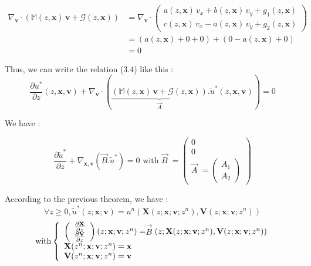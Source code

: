 \documentclass[10pt]{article}
\newcommand{\D}{{\partial}}
\begin{document}
\begin{align*}
\nabla_{\mathbf{v}} \cdot \left(\mathbb{M}(z,\mathbf{x})\,\mathbf{v}+\mathcal{G}(z,\mathbf{x})\right)
&= \nabla_{\mathbf{v}} \cdot \left(\begin{array}{c}
a(z,\mathbf{x})\,v_x+b(z,\mathbf{x})\,v_y+g_1(z,\mathbf{x}) \\ c(z,\mathbf{x})\,v_x-a(z,\mathbf{x})\,v_y+g_2(z,\mathbf{x})
\end{array}\right) \\
&= (a(z,\mathbf{x}) + 0 + 0) + (0 - a(z,\mathbf{x}) + 0) \\
&= 0
\end{align*}

Thus, we can write the relation (3.4) like this : \\

$$
\frac{\D u^*}{\D z}(z,\mathbf{x},\mathbf{v}) + \nabla_{\mathbf{v}}\cdot\left(\underbrace{\left(\mathbb{M}(z,\mathbf{x})\,\mathbf{v}+\mathcal{G}(z,\mathbf{x})\right)}_{\stackrel{\rightarrow}{A}}.\tilde{u}^*(z,\mathbf{x},\mathbf{v})\right) = 0
$$

We have :

$$\frac{\D \tilde{u}^*}{\D z} + \nabla_{\mathbf{x,v}}\left(\stackrel{\rightarrow}{B}.\tilde{u}^*\right) = 0 \mbox{ with } \stackrel{\rightarrow}{B}\; = \left(\begin{array}{c}
0 \\ 0 \\ \stackrel{\rightarrow}{A}\; = \left(\begin{array}{c}
A_1 \\ A_2
\end{array}\right)
\end{array}\right)$$

According to the previous theorem, we have :
$$
\forall z\geqslant 0, \tilde{u}^*(z;\mathbf{x;v}) = u^n\left(\mathbf{X}(z;\mathbf{x;v};z^n),\mathbf{V}(z;\mathbf{x;v};z^n)\right)
$$
$$
\mbox{ with} \\
\left\lbrace\begin{array}{l}
\left(\begin{array}{c}
\frac{\D \mathbf{X}}{\D z} \\ \frac{\D \mathbf{V}}{\D z}
\end{array}\right) (z;\mathbf{x;v};z^n) = \stackrel{\rightarrow}{B}\left(z;\mathbf{X}(z;\mathbf{x;v};z^n),\mathbf{V}(z;\mathbf{x;v};z^n)\right) \\
\mathbf{X}(z^n;\mathbf{x;v};z^n) = \mathbf{x} \\
\mathbf{V}(z^n;\mathbf{x;v};z^n) = \mathbf{v}
\end{array}
\right.
$$
\end{document}
